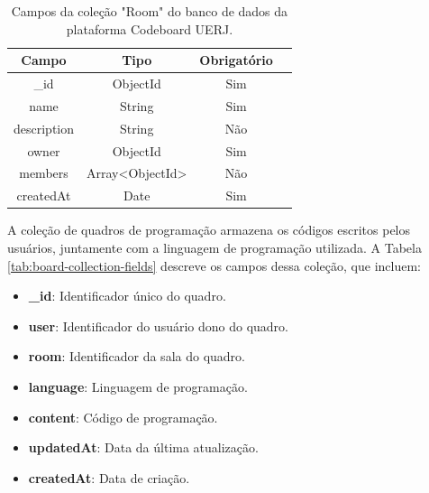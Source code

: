 \begin{table}[H]
    \centering
    \caption{Campos da coleção "Room" do banco de dados da plataforma Codeboard UERJ.}
    \label{tab:room-collection-fields}
    \renewcommand{\arraystretch}{1.3} 
    \begin{tabular}{|c|c|c|c|}
        \hline
        \textbf{Campo}              & \textbf{Tipo}   & \textbf{Obrigatório} \\
        \hline
        \_id              & ObjectId        & Sim                  \\
        \hline
        name                          & String          & Sim                  \\
        \hline
        description               & String          & Não                  \\
        \hline
        owner          & ObjectId        & Sim                  \\
        \hline
        members        & Array<ObjectId> & Não                  \\
        \hline
        createdAt           & Date            & Sim                  \\
        \hline
    \end{tabular}
\end{table}


A coleção de quadros de programação armazena os códigos escritos pelos usuários, juntamente com a linguagem de programação utilizada. A Tabela \ref{tab:board-collection-fields} descreve os campos dessa coleção, que incluem:

\begin{itemize}
    \item \textbf{\_id}: Identificador único do quadro.
    \item \textbf{user}: Identificador do usuário dono do quadro.
    \item \textbf{room}: Identificador da sala do quadro.
    \item \textbf{language}: Linguagem de programação.
    \item \textbf{content}: Código de programação.
    \item \textbf{updatedAt}: Data da última atualização.
    \item \textbf{createdAt}: Data de criação.
\end{itemize}

